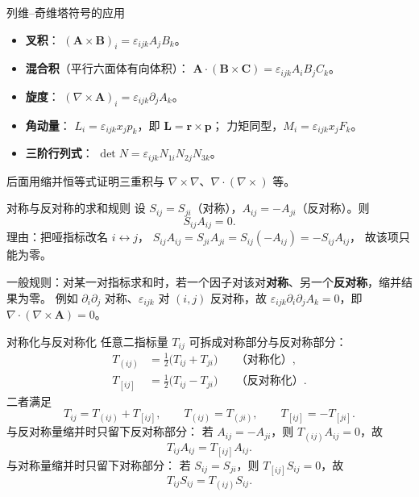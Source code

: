 \documentclass[fontset=windows, chinese, 10pt, xcolor=dvipsnames]{beamer}
\begin{document}
\begin{frame}{列维--奇维塔符号的应用}
  \footnotesize
  \begin{itemize}
    \item \textbf{叉积}：
      $(\mathbf{A}\times\mathbf{B})_i=\varepsilon_{ijk}A_j B_k$。
    \item \textbf{混合积}（平行六面体有向体积）：
      $\mathbf{A}\cdot(\mathbf{B}\times\mathbf{C})
      =\varepsilon_{ijk}A_i B_j C_k$。
    \item \textbf{旋度}：
      $(\nabla\times\mathbf{A})_i=\varepsilon_{ijk}\partial_j A_k$。
    \item \textbf{角动量}：
      $L_i=\varepsilon_{ijk}x_j p_k$，即 $\mathbf{L}=\mathbf{r}\times\mathbf{p}$；
      力矩同型，$M_i=\varepsilon_{ijk}x_j F_k$。
    \item \textbf{三阶行列式}：
      $\det N=\varepsilon_{ijk}N_{1i}N_{2j}N_{3k}$。
  \end{itemize}
  后面用缩并恒等式证明三重积与 $\nabla\times\nabla$、$\nabla\cdot(\nabla\times)$ 等。
\end{frame}

\begin{frame}{对称与反对称的求和规则}
  设 $S_{ij}=S_{ji}$（对称），$A_{ij}=-A_{ji}$（反对称）。则
  \begin{equation*}
    \boxed{S_{ij}A_{ij}=0.}
  \end{equation*}
  理由：把哑指标改名 $i\leftrightarrow j$，
  $S_{ij}A_{ij}=S_{ji}A_{ji}=S_{ij}(-A_{ij})=-S_{ij}A_{ij}$，
  故该项只能为零。

  \medskip
  一般规则：对某一对指标求和时，若一个因子对该对\textbf{对称}、另一个\textbf{反对称}，缩并结果为零。
  例如 $\partial_i\partial_j$ 对称、$\varepsilon_{ijk}$ 对 $(i,j)$ 反对称，故
  $\varepsilon_{ijk}\partial_i\partial_j A_k=0$，即 $\nabla\cdot(\nabla\times\mathbf{A})=0$。
\end{frame}

\begin{frame}{对称化与反对称化}
  任意二指标量 $T_{ij}$ 可拆成对称部分与反对称部分：
  \begin{align*}
    T_{(ij)}
    &=\frac12\bigl(T_{ij}+T_{ji}\bigr)
    &&\text{（对称化）},\\
    T_{[ij]}
    &=\frac12\bigl(T_{ij}-T_{ji}\bigr)
    &&\text{（反对称化）}.
  \end{align*}
  二者满足
  \begin{equation*}
    T_{ij}=T_{(ij)}+T_{[ij]},
    \qquad
    T_{(ij)}=T_{(ji)},
    \qquad
    T_{[ij]}=-T_{[ji]}.
  \end{equation*}
  与反对称量缩并时只留下反对称部分：
  若 $A_{ij}=-A_{ji}$，则 $T_{(ij)}A_{ij}=0$，故
  \[
  T_{ij}A_{ij}=T_{[ij]}A_{ij}.
  \]
  与对称量缩并时只留下对称部分：
  若 $S_{ij}=S_{ji}$，则 $T_{[ij]}S_{ij}=0$，故
  \[
  T_{ij}S_{ij}=T_{(ij)}S_{ij}.
  \]
\end{frame}
\end{document}
